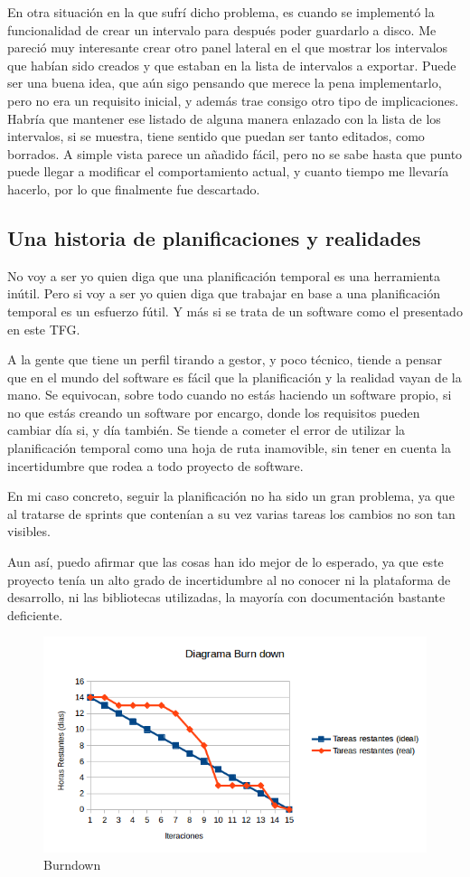 En otra situaci\'on en la que sufr\'i dicho problema, es cuando se implement\'o la funcionalidad de crear un intervalo
para despu\'es poder guardarlo a disco. Me pareci\'o muy interesante crear otro panel lateral en el que mostrar los intervalos 
que hab\'ian sido creados y que estaban en la lista de intervalos a exportar. Puede ser una buena idea, que a\'un sigo pensando
que merece la pena implementarlo, pero no era un requisito inicial, y adem\'as trae consigo otro tipo de implicaciones. 
Habr\'ia que mantener ese listado de alguna manera enlazado con la lista de los intervalos, si se muestra, tiene sentido
que puedan ser tanto editados, como borrados. A simple vista parece un a\~nadido f\'acil, pero no se sabe hasta que punto
puede llegar a modificar el comportamiento actual, y cuanto tiempo me llevar\'ia hacerlo, por lo que finalmente
fue descartado.

\subsection{Una historia de planificaciones y realidades}
No voy a ser yo quien diga que una planificaci\'on temporal es una herramienta in\'util.
Pero si voy a ser yo quien diga que trabajar en base a una planificaci\'on temporal es
un esfuerzo f\'util. Y m\'as si se trata de un software como el presentado
en este TFG.

A la gente que tiene un perfil tirando a gestor, y poco t\'ecnico, tiende a pensar
que en el mundo del software es f\'acil que la planificaci\'on y la realidad
vayan de la mano. Se equivocan, sobre todo cuando no est\'as haciendo un software propio,
si no que est\'as creando un software por encargo, donde los requisitos pueden
cambiar d\'ia si, y d\'ia tambi\'en. Se tiende a cometer el error de utilizar la planificaci\'on
temporal como una hoja de ruta inamovible, sin tener en cuenta la incertidumbre que rodea
a todo proyecto de software.

En mi caso concreto, seguir la planificaci\'on no ha sido un gran problema, ya que al tratarse
de sprints que conten\'ian a su vez varias tareas los cambios no son tan visibles.

Aun as\'i, puedo afirmar que las cosas han ido mejor de lo esperado, ya que este proyecto
ten\'ia un alto grado de incertidumbre al no conocer ni la plataforma de desarrollo, ni las
bibliotecas utilizadas, la mayor\'ia con documentaci\'on bastante deficiente.

\begin{figure}
\centering
\includegraphics[width=0.7\linewidth]{./Figures/burndown.png}
\caption{Burndown}
\label{fig:burndown}
\end{figure}

